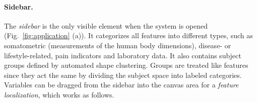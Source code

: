 \documentclass[journal]{style/vgtc} 			          %
\begin{document}
\paragraph{Sidebar.}
The \emph{sidebar} is the only visible element when the system is opened (Fig.~\ref{fig:application} (a)).
%
It categorizes all features into different types, such as somatometric (measurements of the human body dimensions), disease- or lifestyle-related, pain indicators and laboratory data.
%
It also contains subject groups defined by automated shape clustering.
%
Groups are treated like features since they act the same by dividing the subject space into labeled categories.
%
Variables can be dragged from the sidebar into the canvas area for a \emph{feature localization}, which works as follows.
%
\end{document}
